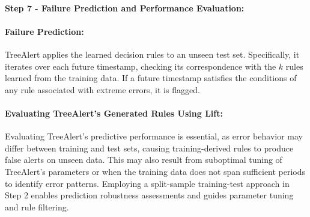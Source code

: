 \documentclass[]{interact}
\theoremstyle{definition}
\begin{document}



\paragraph*{Step 7 - Failure Prediction and Performance Evaluation:}

\paragraph*{Failure Prediction:}

TreeAlert applies the learned decision rules to an unseen test set. Specifically, it iterates over each future timestamp, checking its correspondence with the $k$ rules learned from the training data. If a future timestamp satisfies the conditions of any rule associated with extreme errors, it is flagged.

\paragraph*{Evaluating TreeAlert’s Generated Rules Using Lift:}
\label{Sup-A}

Evaluating TreeAlert's predictive performance is essential, as error behavior may differ between training and test sets, causing training-derived rules to produce false alerts on unseen data. This may also result from suboptimal tuning of TreeAlert’s parameters or when the training data does not span sufficient periods to identify error patterns. Employing a split-sample training-test approach in Step 2 enables prediction robustness assessments and guides parameter tuning and rule filtering. 
\end{document}
